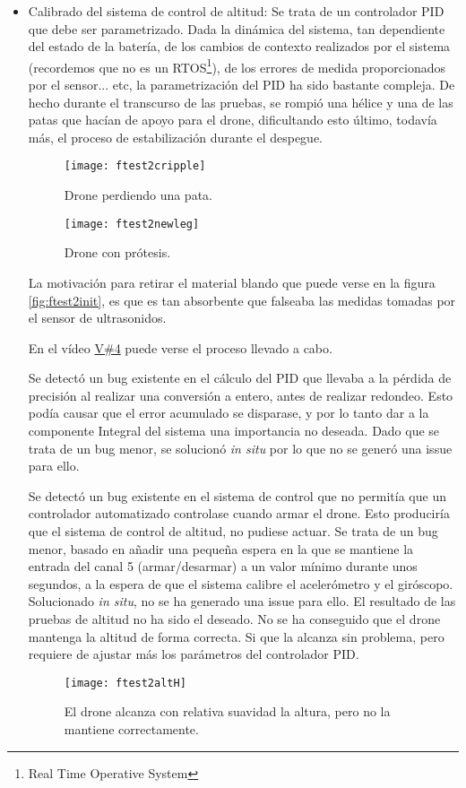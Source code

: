 \begin{itemize}
\item Calibrado del sistema de control de altitud: Se trata de un controlador PID que debe ser parametrizado. Dada la dinámica del sistema, tan dependiente del estado de la batería, de los cambios de contexto realizados por el sistema (recordemos que no es un RTOS\footnote{Real Time Operative System}), de los errores de medida proporcionados por el sensor... etc, la parametrización del PID ha sido bastante compleja. De hecho durante el transcurso de las pruebas, se rompió una hélice y una de las patas que hacían de apoyo para el drone, dificultando esto último, todavía más, el proceso de estabilización durante el despegue. 
\begin{figure}[H]
	\centering
	\texttt{[image: ftest2cripple]}
	\caption[Field Test 2. Demasiada kP]{Drone perdiendo una pata.}\label{fig:ftest2cripple}
\end{figure}
\begin{figure}[H]
	\centering
	\texttt{[image: ftest2newleg]}
	\caption[Field Test 2. Prótesis]{Drone con prótesis.}\label{fig:ftest2newleg}
\end{figure}

La motivación para retirar el material blando que puede verse en la figura \ref{fig:ftest2init}, es que es tan absorbente que falseaba las medidas tomadas por el sensor de ultrasonidos.

En el vídeo \href{FALTA REF!!!}{V\#4} puede verse el proceso llevado a cabo. 

Se detectó un bug existente en el cálculo del PID que llevaba a la pérdida de precisión al realizar una conversión a entero, antes de realizar redondeo. Esto podía causar que el error acumulado se disparase, y por lo tanto dar a la componente Integral del sistema una importancia no deseada. Dado que se trata de un bug menor, se solucionó \textit{in situ} por lo que no se generó una issue para ello.

Se detectó un bug existente en el sistema de control que no permitía que un controlador automatizado controlase cuando armar el drone. Esto produciría que el sistema de control de altitud, no pudiese actuar. Se trata de un bug menor, basado en añadir una pequeña espera en la que se mantiene la entrada del canal 5 (armar/desarmar) a un valor mínimo durante unos segundos, a la espera de que el sistema calibre el acelerómetro y el giróscopo. Solucionado \textit{in situ}, no se ha generado una issue para ello.
 El resultado de las pruebas de altitud no ha sido el deseado. No se ha conseguido que el drone mantenga la altitud de forma correcta. Si que la alcanza sin problema, pero requiere de ajustar más los parámetros del controlador PID.
 \begin{figure}[H]
	\centering
	\texttt{[image: ftest2altH]}
	\caption[Field Test 2. Altura alcanzada con suavidad]{El drone alcanza con relativa suavidad la altura, pero no la mantiene correctamente.}\label{fig:ftest2cripple}
\end{figure}
 

\end{itemize}
